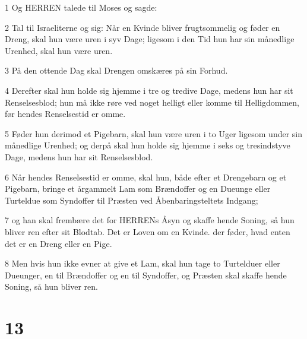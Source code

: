 \par 1 Og HERREN talede til Moses og sagde:
\par 2 Tal til Israeliterne og sig: Når en Kvinde bliver frugtsommelig og føder en Dreng, skal hun være uren i syv Dage; ligesom i den Tid hun har sin månedlige Urenhed, skal hun være uren.
\par 3 På den ottende Dag skal Drengen omskæres på sin Forhud.
\par 4 Derefter skal hun holde sig hjemme i tre og tredive Dage, medens hun har sit Renselsesblod; hun må ikke røre ved noget helligt eller komme til Helligdommen, før hendes Renselsestid er omme.
\par 5 Føder hun derimod et Pigebarn, skal hun være uren i to Uger ligesom under sin månedlige Urenhed; og derpå skal hun holde sig hjemme i seks og tresindstyve Dage, medens hun har sit Renselsesblod.
\par 6 Når hendes Renselsestid er omme, skal hun, både efter et Drengebarn og et Pigebarn, bringe et årgammelt Lam som Brændoffer og en Dueunge eller Turteldue som Syndoffer til Præsten ved Åbenbaringsteltets Indgang;
\par 7 og han skal frembære det for HERRENs Åsyn og skaffe hende Soning, så hun bliver ren efter sit Blodtab. Det er Loven om en Kvinde. der føder, hvad enten det er en Dreng eller en Pige.
\par 8 Men hvis hun ikke evner at give et Lam, skal hun tage to Turtelduer eller Dueunger, en til Brændoffer og en til Syndoffer, og Præsten skal skaffe hende Soning, så hun bliver ren.

\chapter{13}

